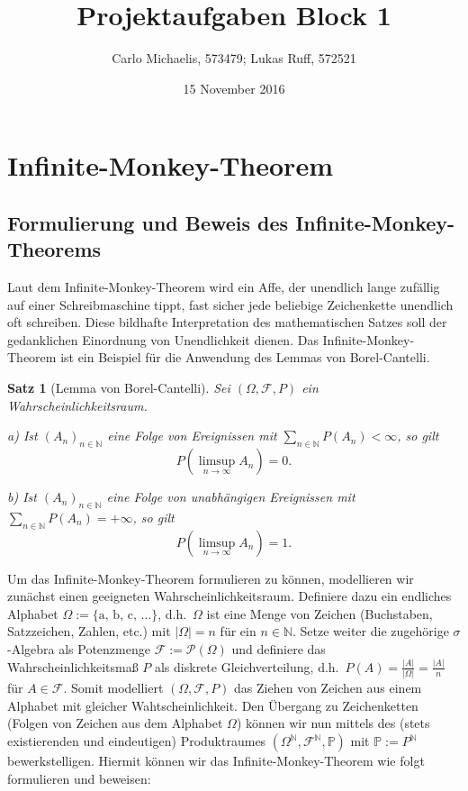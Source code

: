 \documentclass[10pt,]{article}
\title{Projektaufgaben Block 1}
\author{Carlo Michaelis, 573479; Lukas Ruff, 572521}
\date{15 November 2016}
\newtheorem{satz}{Satz}
\begin{document}
\maketitle


\section{Infinite-Monkey-Theorem}\label{infinite-monkey-theorem}

\subsection{Formulierung und Beweis des
Infinite-Monkey-Theorems}\label{formulierung-und-beweis-des-infinite-monkey-theorems}

Laut dem Infinite-Monkey-Theorem wird ein Affe, der unendlich lange
zufällig auf einer Schreibmaschine tippt, fast sicher jede beliebige
Zeichenkette unendlich oft schreiben. Diese bildhafte Interpretation des
mathematischen Satzes soll der gedanklichen Einordnung von Unendlichkeit
dienen. Das Infinite-Monkey-Theorem ist ein Beispiel für die Anwendung
des Lemmas von Borel-Cantelli. \newline

\begin{satz}[Lemma von Borel-Cantelli] 
Sei $(\Omega, \mathcal{F}, P)$ ein Wahrscheinlichkeitsraum.

a) Ist $(A_n)_{n \in \mathbb{N}}$ eine Folge von Ereignissen mit $\sum_{n \in \mathbb{N}} P(A_n) < \infty$, so gilt 
$$ 
P \left( \limsup_{n \to \infty} A_n \right) = 0.
$$

b) Ist $(A_n)_{n \in \mathbb{N}}$ eine Folge von unabhängigen Ereignissen mit $\sum_{n \in \mathbb{N}} P(A_n) = + \infty$, so gilt 
$$
P \left( \limsup_{n \to \infty} A_n \right) = 1.
$$
\end{satz}

Um das Infinite-Monkey-Theorem formulieren zu können, modellieren wir
zunächst einen geeigneten Wahrscheinlichkeitsraum. Definiere dazu ein
endliches Alphabet \(\Omega := \{\text{a, b, c, } \ldots \}\),
d.h.~\(\Omega\) ist eine Menge von Zeichen (Buchstaben, Satzzeichen,
Zahlen, etc.) mit \(\vert \Omega \vert = n\) für ein
\(n \in \mathbb{N}\). Setze weiter die zugehörige \(\sigma\)-Algebra als
Potenzmenge \(\mathcal{F} := \mathcal{P}(\Omega)\) und definiere das
Wahrscheinlichkeitsmaß \(P\) als diskrete Gleichverteilung,
d.h.~\(P(A) = \frac{\vert A \vert}{\vert \Omega \vert} = \frac{\vert A \vert}{n}\)
für \(A \in \mathcal{F}\). Somit modelliert \((\Omega, \mathcal{F}, P)\)
das Ziehen von Zeichen aus einem Alphabet mit gleicher
Wahtscheinlichkeit. Den Übergang zu Zeichenketten (Folgen von Zeichen
aus dem Alphabet \(\Omega\)) können wir nun mittels des (stets
existierenden und eindeutigen) Produktraumes
\((\Omega^{\mathbb{N}}, \mathcal{F}^{\mathbb{N}}, \mathbb{P})\) mit
\(\mathbb{P} := P^{\mathbb{N}}\) bewerkstelligen. Hiermit können wir das
Infinite-Monkey-Theorem wie folgt formulieren und beweisen: \newline
\end{document}
